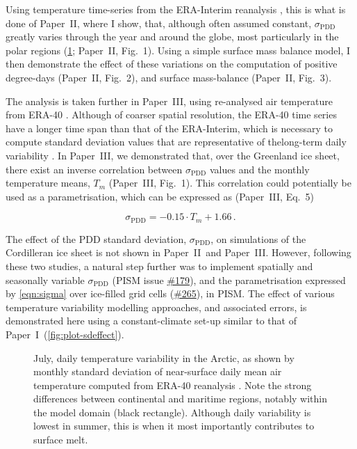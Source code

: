 \documentclass{article}
\newcommand{\sPDD}[0]{\sigma_{\mathrm{PDD}}}
\newcommand{\CCLI}[0]{Paper~I}      %
\newcommand{\PSDV}[0]{Paper~II}     %
\newcommand{\PSDP}[0]{Paper~III}    %
\newcommand{\issue}[1]{\href{https://github.com/pism/pism/issues/#1}{\##1}}
\begin{document}
Using temperature time-series from the ERA-Interim reanalysis
\citep{Dee.etal.2011}, this is what is done of \PSDV, where I show, that,
although often assumed constant, $\sPDD$ greatly varies through the year and
around the globe, most particularly in the polar regions
(\cref{fig:plot-sdmap}; \PSDV, Fig.~1). Using a simple surface mass balance
model, I then demonstrate the effect of these variations on the computation of
positive degree-days (\PSDV, Fig.~2), and surface mass-balance (\PSDV, Fig.~3).

The analysis is taken further in \PSDP, using re-analysed air temperature from
ERA-40 \citep{Uppala.etal.2005}. Although of coarser spatial resolution, the
ERA-40 time series have a longer time span than that of the ERA-Interim, which
is necessary to compute standard deviation values that are representative of
thelong-term daily variability \citep{Rogozhina.Rau.2014}. In \PSDP, we
demonstrated that, over the Greenland ice sheet, there exist an inverse
correlation between $\sPDD$ values and the monthly temperature means, $T_m$
(\PSDP, Fig.~1). This correlation could potentially be used as a
parametrisation, which can be expressed as (\PSDP, Eq.~5)

\begin{equation}
    \label{eqn:sigma}
    \sPDD = -0.15 \cdot T_{m} + 1.66\,.
\end{equation}

The effect of the PDD standard deviation, $\sPDD$, on simulations of the
Cordilleran ice sheet is not shown in \PSDV\ and \PSDP. However, following
these two studies, a natural step further was to implement spatially and
seasonally variable $\sPDD$ (PISM issue \issue{179}), and the parametrisation
expressed by \cref{eqn:sigma} over ice-filled grid cells (\issue{265}), in
PISM. The effect of various temperature variability modelling approaches, and
associated errors, is demonstrated here using a constant-climate set-up similar
to that of \CCLI\ (\cref{fig:plot-sdeffect}).

\begin{figure}
  \centering
  \caption{July, daily temperature variability in the Arctic, as shown by
           monthly standard deviation of near-surface daily mean air
           temperature computed from ERA-40 reanalysis
           \citep{Uppala.etal.2005}. Note the strong differences between
           continental and maritime regions, notably within the model domain
           (black rectangle). Although daily variability is lowest in summer,
           this is when it most importantly contributes to surface melt.}
  \label{fig:plot-sdmap}
\end{figure}
\end{document}
